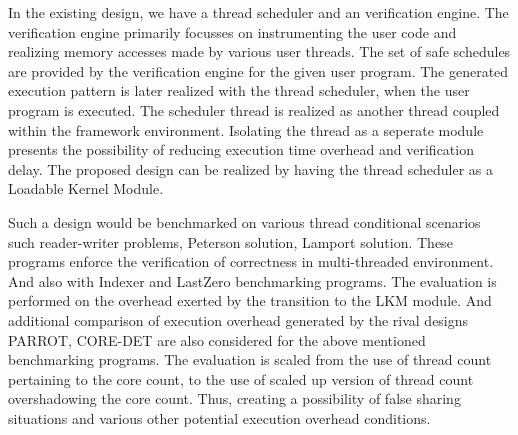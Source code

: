 \documentclass[12pt]{article}
\begin{document}
In the existing design, we have a thread scheduler and an verification engine.  
The verification engine primarily focusses on instrumenting the user code and realizing memory accesses made by various user threads. 
The set of safe schedules are provided by the verification engine for the given user program. 
The generated execution pattern is later realized with the thread scheduler, when the user program is executed. 
The scheduler thread is realized as another thread coupled within the framework environment. 
Isolating the thread as a seperate module presents the possibility of reducing execution time overhead and verification delay.  
The proposed design can be realized by having the thread scheduler as a Loadable Kernel Module. 

Such a design would be benchmarked on various thread conditional scenarios such reader-writer problems, Peterson solution, Lamport solution. 
These programs enforce the verification of correctness in multi-threaded environment. 
And also with Indexer and LastZero benchmarking programs. 
The evaluation is performed on the overhead exerted by the transition to the LKM module. 
And additional comparison of execution overhead generated by the rival designs PARROT, CORE-DET are also considered for the above mentioned benchmarking programs. 
The evaluation is scaled from the use of thread count pertaining to the core count, to the use of scaled up version of thread count overshadowing the core count. 
Thus, creating a possibility of false sharing situations and various other potential execution overhead conditions. 
\end{document}
